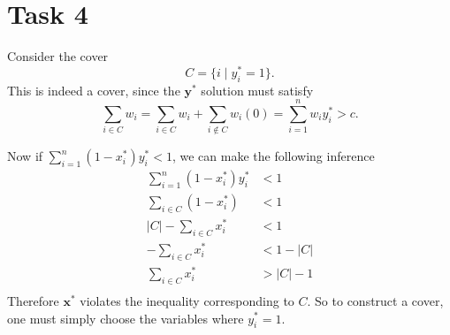\documentclass{article}
\begin{document}
\maketitle
\noindent

\section*{Task 4}%

Consider the cover 
\[
C = \{ i \;|\; y_i^* = 1\}.
\]
This is indeed a cover, since the $\mathbf{y}^*$ solution must satisfy
\[
\sum_{i \in C}^{} w_i = \sum_{i \in C}^{} w_i + \sum_{i \notin C}^{} w_i(0) =  \sum_{i=1}^{n} w_i y_i^* > c.
\]

Now if $\sum_{i=1}^{n}(1 - x_i^*)y_{i}^* < 1$, we can make the following inference
\begin{align*}
   \sum_{i=1}^{n} (1 - x_i^*)y_i^* &< 1 \\ 
   \sum_{i \in C} (1 - x_i^*) &< 1 \\ 
  |C| -\sum_{i \in C} x_i^* &< 1 \\ 
  -\sum_{i \in C} x_i^* &< 1 - |C|\\ 
  \sum_{i \in C} x_i^* &> |C| - 1\\ 
\end{align*}
Therefore $\mathbf{x}^*$ violates the inequality corresponding to $C$.
So to construct a cover, one must simply choose the variables where $y^*_i = 1$.



%
\end{document}
